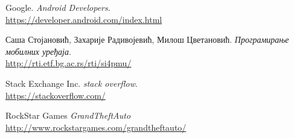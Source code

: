 


\begin{thebibliography}{15}
		Google.
		\emph{Android Developers}.\\
		\url{https://developer.android.com/index.html}
		
		Саша Стојановић, Захарије Радивојевић, Милош Цветановић.
		\emph{Програмирање мобилних уређаја}.\\
		\url{http://rti.etf.bg.ac.rs/rti/si4pmu/}
		
		Stack Exchange Inc.
		\emph{stack overflow}.\\
		\url{https://stackoverflow.com/}
		
		RockStar Games 
		\emph{GrandTheftAuto}
		\url{http://www.rockstargames.com/grandtheftauto/}
		


\end{thebibliography}